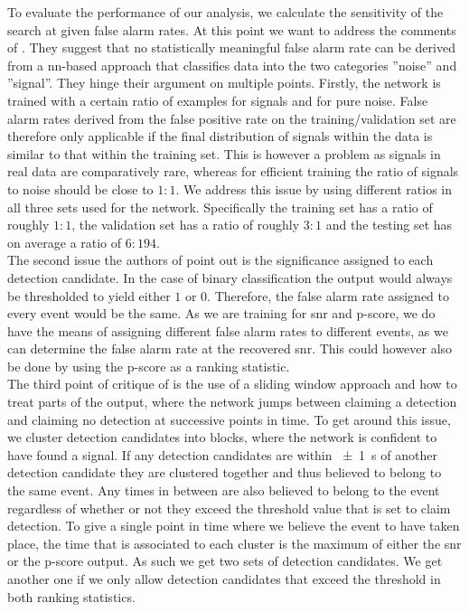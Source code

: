 To evaluate the performance of our analysis, we calculate the sensitivity of the search at given false alarm rates. At this point we want to address the comments of \cite{cnn_magiacal_bullet}. They suggest that no statistically meaningful false alarm rate can be derived from a \gls{nn}-based approach that classifies data into the two categories ''noise'' and ''signal''. They hinge their argument on multiple points. Firstly, the network is trained with a certain ratio of examples for signals and for pure noise. False alarm rates derived from the false positive rate on the training/validation set are therefore only applicable if the final distribution of signals within the data is similar to that within the training set. This is however a problem as signals in real data are comparatively rare, whereas for efficient training the ratio of signals to noise should be close to $1:1$. We address this issue by using different ratios in all three sets used for the network. Specifically the training set has a ratio of roughly $1:1$, the validation set has a ratio of roughly $3:1$ and the testing set has on average a ratio of $6:194$.\\
The second issue the authors of \cite{cnn_magiacal_bullet} point out is the significance assigned to each detection candidate. In the case of binary classification the output would always be thresholded to yield either $1$ or $0$. Therefore, the false alarm rate assigned to every event would be the same. As we are training for \gls{snr} and p-score, we do have the means of assigning different false alarm rates to different events, as we can determine the false alarm rate at the recovered \gls{snr}. This could however also be done by using the p-score as a ranking statistic.\\
The third point of critique of \cite{cnn_magiacal_bullet} is the use of a sliding window approach and how to treat parts of the output, where the network jumps between claiming a detection and claiming no detection at successive points in time. To get around this issue, we cluster detection candidates into blocks, where the network is confident to have found a signal. If any detection candidates are within \SI{\pm 1}{\s} of another detection candidate they are clustered together and thus believed to belong to the same event. Any times in between are also believed to belong to the event regardless of whether or not they exceed the threshold value that is set to claim detection. To give a single point in time where we believe the event to have taken place, the time that is associated to each cluster is the maximum of either the \gls{snr} or the p-score output. As such we get two sets of detection candidates. We get another one if we only allow detection candidates that exceed the threshold in both ranking statistics.\\
